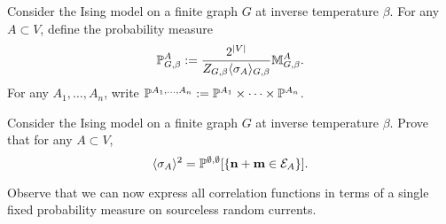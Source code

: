 \begin{definition}
    Consider the Ising model on a finite graph $G$
    at inverse temperature $\beta$.
    For any $A\subset V$,
    define the probability measure
    \[
        \P^A_{G,\beta}:=\frac{2^{|V|}}{Z_{G,\beta}\langle\sigma_A\rangle_{G,\beta}}\M^A_{G,\beta}.
    \]
    For any $A_1,\ldots,A_n$,
    write $\P^{A_1,\ldots,A_n}:=\P^{A_1}\times\cdots\times\P^{A_n}$.
\end{definition}

\begin{exercise}
    Consider the Ising model on a finite graph $G$
    at inverse temperature $\beta$.
    Prove that for any $A\subset V$,
    \[
        \langle\sigma_A\rangle^2
        =
        \P^{\emptyset,\emptyset}[\{\n+\m\in\calE_A\}].
    \]

    Observe that we can now express all correlation functions in terms of a single
    fixed probability measure on sourceless random currents.
\end{exercise}

